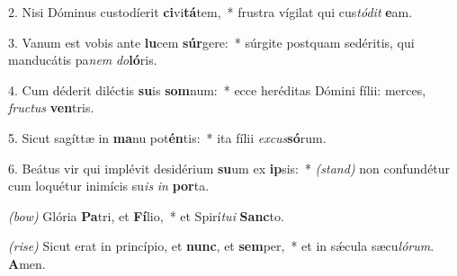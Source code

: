 2. Nisi Dóminus custodíerit \textbf{ci}vi\textbf{tá}\-tem,~* frustra vígilat qui cus\textit{tó}\textit{dit} \textbf{e}am.

3. Vanum est vobis ante \textbf{lu}cem \textbf{súr}gere:~* súrgite postquam sedéritis, qui manducátis pa\textit{nem} \textit{do}\textbf{ló}ris.

4. Cum déderit diléctis \textbf{su}is \textbf{som}\-num:~* ecce heréditas Dómini fílii: merces, \textit{fruc}\textit{tus} \textbf{ven}tris.

5. Sicut sagíttæ in \textbf{ma}nu pot\textbf{én}tis:~* ita fílii \textit{ex}\textit{cus}\textbf{só}rum.

6. Beátus vir qui implévit desidérium \textbf{su}um ex \textbf{ip}sis:~* {\color{red}\textit{(stand)}} non confundétur cum loquétur inimícis su\textit{is} \textit{in} \textbf{por}ta.

{\color{red}\textit{(bow)}} Glória \textbf{Pa}tri, et \textbf{Fí}lio,~* et Spirí\textit{tu}\textit{i} \textbf{Sanc}to.

{\color{red}\textit{(rise)}} Sicut erat in princípio, et \textbf{nunc}, et \textbf{sem}per,~* et in s\'{\ae}cula sæcu\textit{ló}\textit{rum}. \textbf{A}men.